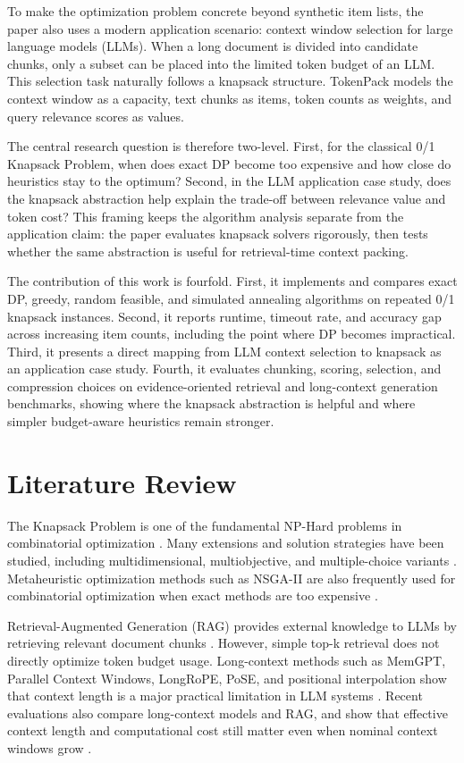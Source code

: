\documentclass[conference]{IEEEtran}
\begin{document}
To make the optimization problem concrete beyond synthetic item lists, the paper also uses a modern application scenario: context window selection for large language models (LLMs). When a long document is divided into candidate chunks, only a subset can be placed into the limited token budget of an LLM. This selection task naturally follows a knapsack structure. TokenPack models the context window as a capacity, text chunks as items, token counts as weights, and query relevance scores as values.

The central research question is therefore two-level. First, for the classical 0/1 Knapsack Problem, when does exact DP become too expensive and how close do heuristics stay to the optimum? Second, in the LLM application case study, does the knapsack abstraction help explain the trade-off between relevance value and token cost? This framing keeps the algorithm analysis separate from the application claim: the paper evaluates knapsack solvers rigorously, then tests whether the same abstraction is useful for retrieval-time context packing.

The contribution of this work is fourfold. First, it implements and compares exact DP, greedy, random feasible, and simulated annealing algorithms on repeated 0/1 knapsack instances. Second, it reports runtime, timeout rate, and accuracy gap across increasing item counts, including the point where DP becomes impractical. Third, it presents a direct mapping from LLM context selection to knapsack as an application case study. Fourth, it evaluates chunking, scoring, selection, and compression choices on evidence-oriented retrieval and long-context generation benchmarks, showing where the knapsack abstraction is helpful and where simpler budget-aware heuristics remain stronger.

\section{Literature Review}
The Knapsack Problem is one of the fundamental NP-Hard problems in combinatorial optimization \cite{karp1972reducibility,martello1990knapsack}. Many extensions and solution strategies have been studied, including multidimensional, multiobjective, and multiple-choice variants \cite{cacchiani2022recent,lust2010multiobjective,szkaliczki2025mckp}. Metaheuristic optimization methods such as NSGA-II are also frequently used for combinatorial optimization when exact methods are too expensive \cite{verma2021nsga}.

Retrieval-Augmented Generation (RAG) provides external knowledge to LLMs by retrieving relevant document chunks \cite{lewis2020rag}. However, simple top-k retrieval does not directly optimize token budget usage. Long-context methods such as MemGPT, Parallel Context Windows, LongRoPE, PoSE, and positional interpolation show that context length is a major practical limitation in LLM systems \cite{packer2023memgpt,ratner2023pcw,ding2024longrope,zhu2023pose,chen2023positional}. Recent evaluations also compare long-context models and RAG, and show that effective context length and computational cost still matter even when nominal context windows grow \cite{xu2023retrieval,li2024longcontextrag,paulsen2025effective,ahmed2025optimization}.
\end{document}
